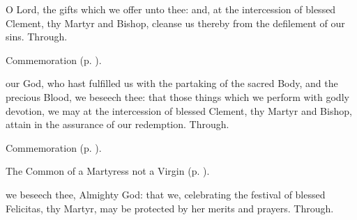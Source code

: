 \secret

\vspace{-0.1\baselineskip}

 O Lord, the gifts which we offer unto thee: and, at the intercession of blessed Clement, thy Martyr and Bishop, cleanse us thereby from the defilement of our sins. Through.

\begin{rubric}
    Commemoration  (p. \pageref{FelicitySecret}).
\end{rubric}


\vspace{-0.2\baselineskip}

\postcommunion

\vspace{-0.1\baselineskip}

 our God, who hast fulfilled us with the partaking of the sacred Body, and the precious Blood, we beseech thee: that those things which we perform with godly devotion, we may at the intercession of blessed Clement, thy Martyr and Bishop, attain in the assurance of our redemption. Through.

\begin{rubric}
    Commemoration  (p. \pageref{FelicityPostcommunion}).
\end{rubric}



\begin{rubric}
	The Common of a Martyress not a Virgin (p. \pageref{CommonMartyrNotVirgin}).
\end{rubric}

\vspace{-0.2\baselineskip}

\collect\label{FelicityCollect}

\vspace{-0.1\baselineskip}

 we beseech thee, Almighty God: that we, celebrating the festival of blessed Felicitas, thy Martyr, may be protected by her merits and prayers. Through.


